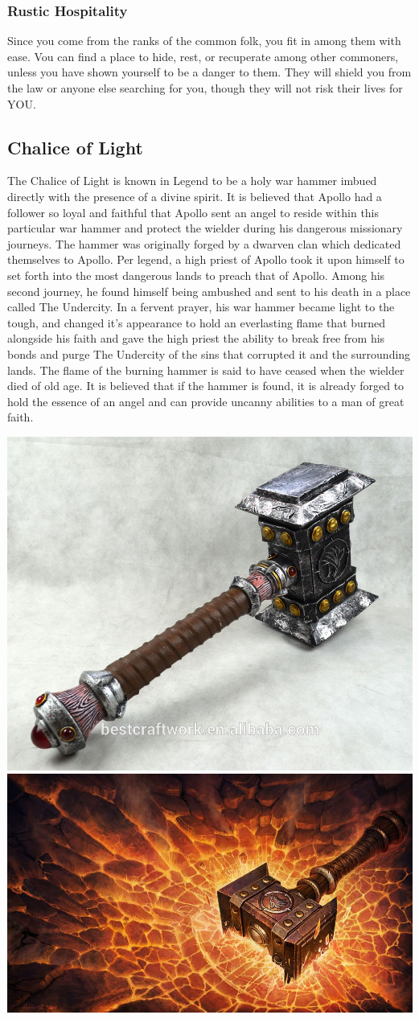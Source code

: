 \documentclass[letterpaper,10pt,twoside,twocolumn,openany]{book}
\begin{document}
\subsubsection{Rustic Hospitality}

Since you come from the ranks of the common folk, you fit in among them with ease. Vou can find a place to hide, rest, or recuperate among other commoners, unless you have shown yourself to be a danger to them. They will shield you from the law or anyone else searching for you, though they will not risk their lives for YOU.

\subsection{Chalice of Light}

The Chalice of Light is known in Legend to be a holy war hammer imbued directly with the presence of a divine spirit. It is believed that Apollo had a follower so loyal and faithful that Apollo sent an angel to reside within this particular war hammer and protect the wielder during his dangerous missionary journeys. The hammer was originally forged by a dwarven clan which dedicated themselves to Apollo. Per legend, a high priest of Apollo took it upon himself to set forth into the most dangerous lands to preach that of Apollo. Among his second journey, he found himself being ambushed and sent to his death in a place called The Undercity. In a fervent prayer, his war hammer became light to the tough, and changed it's appearance to hold an everlasting flame that burned alongside his faith and gave the high priest the ability to break free from his bonds and purge The Undercity of the sins that corrupted it and the surrounding lands. The flame of the burning hammer is said to have ceased when the wielder died of old age. It is believed that if the hammer is found, it is already forged to hold the essence of an angel and can provide uncanny abilities to a man of great faith.

\begin{center}
	\includegraphics[width=0.41\linewidth]{img/Wow-Hammer.jpg} 	\includegraphics[width=0.57\linewidth]{img/shatteredhand.jpg}
\end{center}
\end{document}
